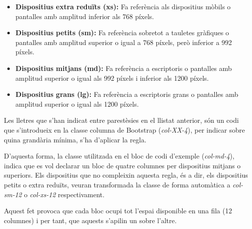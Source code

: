     \begin{itemize}
        \item \textbf{Dispositius extra reduïts (xs):} Fa referència als dispositius mòbils o pantalles amb amplitud inferior als 768 píxels.
        \item \textbf{Dispositius petits (sm):} Fa referència sobretot a tauletes gràfiques o pantalles amb amplitud superior o igual a 768 píxels, però inferior a 992 píxels.
        \item \textbf{Dispositius mitjans (md):} Fa referència a escriptoris o pantalles amb amplitud superior o igual als 992 píxels i inferior als 1200 píxels.
        \item \textbf{Dispositius grans (lg):} Fa referència a escriptoris grans o pantalles amb amplitud superior o igual als 1200 píxels.
    \end{itemize}

    Les lletres que s'han indicat entre parestèsies en el llistat anterior, són un codi que s'introdueix en la classe columna de Bootstrap (\emph{col-XX-4}), per indicar sobre quina grandària mínima, s'ha d'aplicar la regla.

    D'aquesta forma, la classe utilitzada en el bloc de codi d'exemple (\emph{col-md-4}), indica que es vol declarar un bloc de quatre columnes per dispositius mitjans o superiors. Els dispositius que no compleixin aquesta regla, és a dir, els dispositius petits o extra reduïts, veuran transformada la classe de forma automàtica a \emph{col-sm-12} o \emph{col-xs-12} respectivament.

    Aquest fet provoca que cada bloc ocupi tot l'espai disponible en una fila (12 columnes) i per tant, que aquests s'apilin un sobre l'altre.
